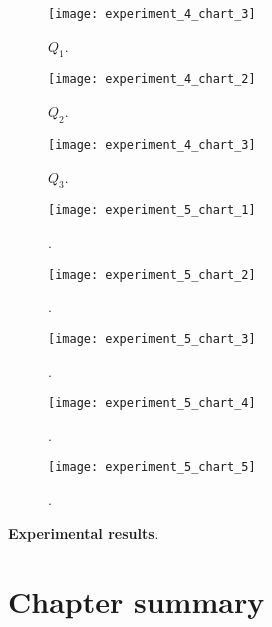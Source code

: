 \begin{figure}[H]
  \centering
  \texttt{[image: experiment\_4\_chart\_3]}
  \caption{$Q_{1}$.}
  \label{fig:???}
\end{figure}
\begin{figure}[H]
  \centering
  \texttt{[image: experiment\_4\_chart\_2]}
  \caption{$Q_{2}$.}
  \label{fig:???}
\end{figure}
\begin{figure}[H]
  \centering
  \texttt{[image: experiment\_4\_chart\_3]}
  \caption{$Q_{3}$.}
  \label{fig:???}
\end{figure}


\begin{figure}[H]
  \centering
  \texttt{[image: experiment\_5\_chart\_1]}
  \caption{.}
  \label{fig:???}
\end{figure}

\begin{figure}[H]
  \centering
  \texttt{[image: experiment\_5\_chart\_2]}
  \caption{.}
  \label{fig:???}
\end{figure}

\begin{figure}[H]
  \centering
  \texttt{[image: experiment\_5\_chart\_3]}
  \caption{.}
  \label{fig:???}
\end{figure}

\begin{figure}[H]
  \centering
  \texttt{[image: experiment\_5\_chart\_4]}
  \caption{.}
  \label{fig:???}
\end{figure}

\begin{figure}[H]
  \centering
  \texttt{[image: experiment\_5\_chart\_5]}
  \caption{.}
  \label{fig:???}
\end{figure}

\textbf{Experimental results}.

\section{Chapter summary}
